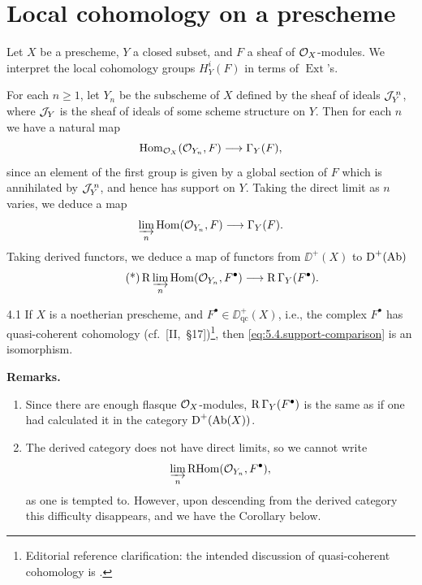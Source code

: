 \par\endgroup

\section{Local cohomology on a prescheme}\label{sec:5.4}

Let $X$ be a prescheme, $Y$ a closed subset, and $F$ a sheaf of $\mathcal{O}_X$-modules. We interpret the local cohomology groups $H_Y^i(F)$ in terms of $\operatorname{Ext}$'s.

For each $n\geq 1$, let $Y_n$ be the subscheme of $X$ defined by the sheaf of ideals $\mathcal{J}_Y^{\,n}$, where $\mathcal{J}_Y$ is the sheaf of ideals of some scheme structure on $Y$. Then for each $n$ we have a natural map
\[
\operatorname{Hom}_{\mathcal{O}_X}(\mathcal{O}_{Y_n}, F)\longrightarrow \Gamma_Y(F),
\]
since an element of the first group is given by a global section of $F$ which is annihilated by $\mathcal{J}_Y^{\,n}$, and hence has support on $Y$. Taking the direct limit as $n$ varies, we deduce a map
\[
\varinjlim_n \operatorname{Hom}(\mathcal{O}_{Y_n}, F)\longrightarrow \Gamma_{Y}(F).
\]
Taking derived functors, we deduce a map of functors from $\DD^{+}(X)$ to $\operatorname{D}^{+}(\operatorname{Ab})$
\begin{equation}\tag{*}\label{eq:5.4.support-comparison}
\operatorname{R}\varinjlim_n \operatorname{Hom}(\mathcal{O}_{Y_n}, F^{\bullet})\longrightarrow \operatorname{R}\Gamma_{Y}(F^{\bullet}).
\end{equation}

\begin{booktheorem}{4.1}\label{thm:5.4.1}
If $X$ is a noetherian prescheme, and $F^\bullet\in\DD^+_{\mathrm{qc}}(X)$, i.e., the complex $F^\bullet$ has quasi-coherent cohomology (cf.\ [II,~\S17])\footnote{Editorial reference clarification: the intended discussion of quasi-coherent cohomology is .}, then \eqref{eq:5.4.support-comparison} is an isomorphism.
\end{booktheorem}

\par\medskip\noindent\textbf{Remarks.}
\begin{enumerate}
\item Since there are enough flasque $\mathcal{O}_X$-modules, $\operatorname{R}\Gamma_Y(F^\bullet)$ is the same as if one had calculated it in the category $\operatorname{D}^+(\operatorname{Ab}(X))$.
\item The derived category does not have direct limits, so we cannot write
\[
\varinjlim_n\operatorname{RHom}(\mathcal{O}_{Y_n}, F^\bullet),
\]
as one is tempted to. However, upon descending from the derived category this difficulty disappears, and we have the Corollary below.
\end{enumerate}
\par\medskip

